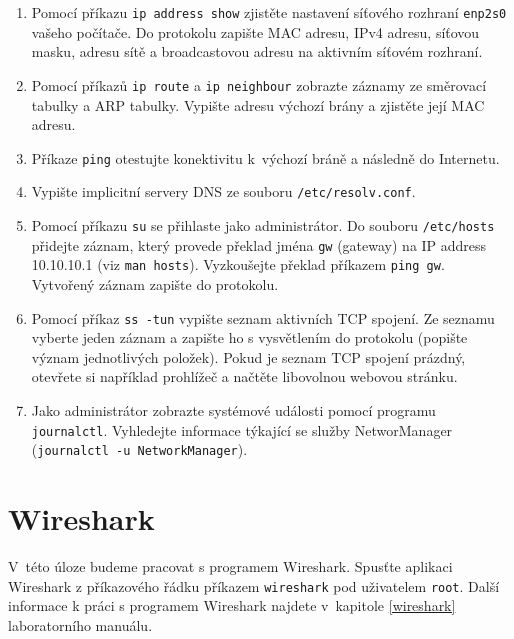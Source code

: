 \documentclass[a4paper,11pt]{article}
\begin{document}
\begin{enumerate}
  \item Pomocí příkazu {\tt ip address show} zjistěte nastavení síťového rozhraní {\tt enp2s0} vašeho počítače. Do protokolu zapište MAC adresu, IPv4 adresu, síťovou masku, adresu sítě a broadcastovou adresu na aktivním síťovém rozhraní.
  \item Pomocí příkazů {\tt ip route} a {\tt ip neighbour} zobrazte záznamy ze směrovací tabulky a ARP tabulky. Vypište adresu výchozí brány a zjistěte její MAC adresu. 
  \item Příkaze {\tt ping} otestujte konektivitu k~výchozí bráně a následně do Internetu. 
  \item Vypište implicitní servery DNS ze souboru {\tt /etc/resolv.conf}.
  \item Pomocí příkazu {\tt su} se přihlaste jako administrátor. Do souboru {\tt /etc/hosts} přidejte záznam, který provede překlad jména {\tt gw} (gateway) na IP address 10.10.10.1 (viz {\tt man hosts}). Vyzkoušejte překlad příkazem {\tt ping gw}. Vytvořený záznam zapište do protokolu. 
  \item Pomocí příkaz {\tt ss -tun} vypište seznam aktivních TCP spojení. Ze seznamu vyberte jeden záznam a zapište ho s vysvětlením do protokolu (popište význam jednotlivých položek). Pokud je seznam TCP spojení prázdný, otevřete si například prohlížeč a načtěte libovolnou webovou stránku. 
  \item Jako administrátor zobrazte systémové události pomocí programu \texttt{journalctl}. Vyhledejte informace týkající se služby NetworManager ({\tt journalctl -u NetworkManager}).  
\end{enumerate}

\section{Wireshark}
V~této úloze budeme pracovat s programem Wireshark. Spusťte aplikaci Wireshark z příkazového řádku příkazem \texttt{wireshark}
pod uživatelem \texttt{root}. Další informace k práci s programem Wireshark najdete v~kapitole \ref{wireshark} laboratorního manuálu. 
\end{document}
